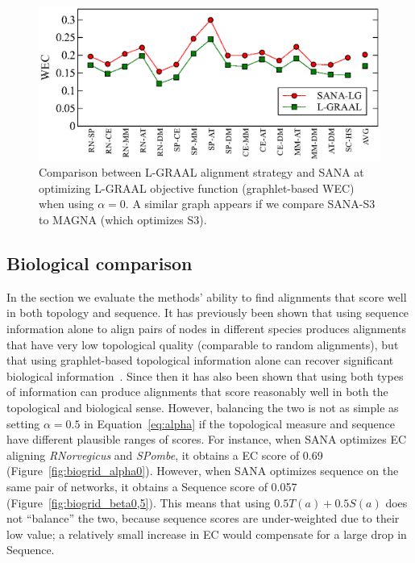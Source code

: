 \documentclass{bioinfo}
\begin{document}
\begin{figure}
\centering
\includegraphics[width=0.99\linewidth]{biogridBeta0wec.eps}
\caption{Comparison between L-GRAAL alignment strategy and SANA at optimizing L-GRAAL objective function (graphlet-based WEC) when using $\alpha=0$. A similar graph appears if we compare SANA-S3 to MAGNA (which optimizes S3).}
\label{fig:lgraalobjfuncomparison}
\end{figure}

\subsection{Biological comparison}\label{bio}

In the section we evaluate the methods' ability to find alignments that score well in both topology and sequence. It has previously been shown that using sequence information alone to align pairs of nodes in different species produces alignments that have very low topological quality (comparable to random alignments), but that using graphlet-based topological information alone can recover significant biological information~\citep{GRAAL}. Since then it has also been shown that using both types of information can produce alignments that score reasonably well in both the topological and biological sense. However, balancing the two is not as simple as setting $\alpha=0.5$ in Equation~\ref{eq:alpha} if the topological measure and sequence have different plausible ranges of scores. For instance, when SANA optimizes EC aligning \textit{RNorvegicus} and \textit{SPombe}, it obtains a EC score of 0.69 (Figure~\ref{fig:biogrid_alpha0}). However, when SANA optimizes sequence on the same pair of networks, it obtains a Sequence score of 0.057 (Figure~\ref{fig:biogrid_beta0,5}). This means that using $0.5T(a) + 0.5S(a)$ does not ``balance'' the two, because sequence scores are under-weighted due to their low value; a relatively small increase in EC would compensate for a large drop in Sequence.
\end{document}
